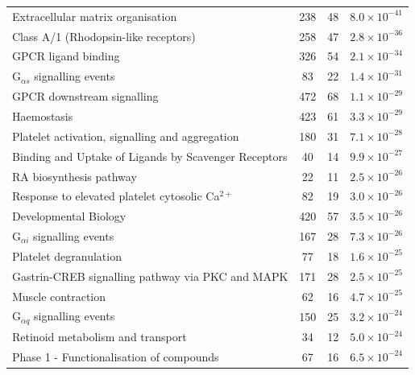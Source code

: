 \begin{table}[!hp]
{\begin{threeparttable}
\begin{tabular}{lccc}
  \hline 
  \rowcolor{Cluster_Red!20}
  Extracellular matrix organisation & 238 &  48 & $8.0 \times 10^{-41}$ \\
  \rowcolor{Cluster_Red!15} 
  Class A/1 (Rhodopsin-like receptors) & 258 &  47 & $2.8 \times 10^{-36}$ \\
  \rowcolor{Cluster_Red!20} 
  GPCR ligand binding & 326 &  54 & $2.1 \times 10^{-34}$ \\
  \rowcolor{Cluster_Red!15} 
  G$_{\alpha s}$ signalling events &  83 &  22 & $1.4 \times 10^{-31}$ \\
  \rowcolor{Cluster_Red!20} 
  GPCR downstream signalling & 472 &  68 & $1.1 \times 10^{-29}$ \\
  \rowcolor{Cluster_Red!15} 
  Haemostasis & 423 &  61 & $3.3 \times 10^{-29}$ \\
  \rowcolor{Cluster_Red!20} 
  Platelet activation, signalling and aggregation & 180 &  31 & $7.1 \times 10^{-28}$ \\
  \rowcolor{Cluster_Red!15} 
  Binding and Uptake of Ligands by Scavenger Receptors &  40 &  14 & $9.9 \times 10^{-27}$ \\
  \rowcolor{Cluster_Red!20} 
  RA biosynthesis pathway &  22 &  11 & $2.5 \times 10^{-26}$ \\
  \rowcolor{Cluster_Red!15} 
  Response to elevated platelet cytosolic Ca$^{2+}$ &  82 &  19 & $3.0 \times 10^{-26}$ \\
  \rowcolor{Cluster_Red!20} 
  Developmental Biology & 420 &  57 & $3.5 \times 10^{-26}$ \\
  \rowcolor{Cluster_Red!15} 
  G$_{\alpha i}$ signalling events & 167 &  28 & $7.3 \times 10^{-26}$ \\
  \rowcolor{Cluster_Red!20} 
  Platelet degranulation &  77 &  18 & $1.6 \times 10^{-25}$ \\
  \rowcolor{Cluster_Red!15} 
  Gastrin-CREB signalling pathway via PKC and MAPK & 171 &  28 & $2.5 \times 10^{-25}$ \\
  \rowcolor{Cluster_Red!20} 
  Muscle contraction &  62 &  16 & $4.7 \times 10^{-25}$ \\
  \rowcolor{Cluster_Red!15} 
  G$_{\alpha q}$ signalling events & 150 &  25 & $3.2 \times 10^{-24}$ \\
  \rowcolor{Cluster_Red!20} 
  Retinoid metabolism and transport &  34 &  12 & $5.0 \times 10^{-24}$ \\
  \rowcolor{Cluster_Red!15} 
  Phase 1 - Functionalisation of compounds &  67 &  16 & $6.5 \times 10^{-24}$ \\

\end{tabular}
\end{threeparttable}}
\end{table}
